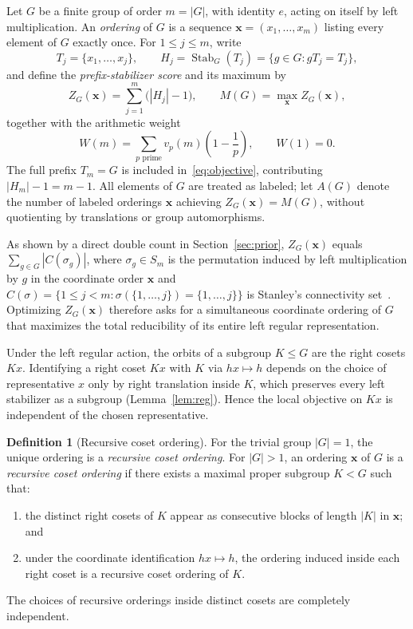 \documentclass[11pt,reqno]{amsart}
\numberwithin{equation}{section}
\theoremstyle{definition}
\newtheorem{definition}[theorem]{Definition}
\theoremstyle{remark}
\newcommand{\Stab}{\operatorname{Stab}}
\begin{document}
Let $G$ be a finite group of order $m = |G|$, with identity $e$, acting on itself by left multiplication. An \emph{ordering} of $G$ is a sequence $\mathbf{x}=(x_1,\ldots,x_m)$ listing every element of $G$ exactly once. For $1\le j\le m$, write
\begin{equation}
\label{eq:defs}
T_j = \{x_1,\ldots,x_j\},\qquad
H_j = \Stab_G(T_j) = \{g\in G : gT_j = T_j\},
\end{equation}
and define the \emph{prefix-stabilizer score} and its maximum by
\begin{equation}
\label{eq:objective}
Z_G(\mathbf{x}) = \sum_{j=1}^{m}\bigl(|H_j|-1\bigr),\qquad
M(G) = \max_{\mathbf{x}} Z_G(\mathbf{x}),
\end{equation}
together with the arithmetic weight
\begin{equation}
\label{eq:weight}
W(m) = \sum_{p\text{ prime}} v_p(m)\!\left(1-\frac{1}{p}\right),\qquad W(1)=0.
\end{equation}
The full prefix $T_m=G$ is included in~\eqref{eq:objective}, contributing $|H_m|-1 = m-1$. All elements of $G$ are treated as labeled; let $A(G)$ denote the number of labeled orderings $\mathbf{x}$ achieving $Z_G(\mathbf{x})=M(G)$, without quotienting by translations or group automorphisms.

As shown by a direct double count in Section~\ref{sec:prior}, $Z_G(\mathbf{x})$ equals $\sum_{g\in G}|C(\sigma_g)|$, where $\sigma_g\in S_m$ is the permutation induced by left multiplication by $g$ in the coordinate order $\mathbf{x}$ and $C(\sigma)=\{1\le j<m : \sigma(\{1,\ldots,j\})=\{1,\ldots,j\}\}$ is Stanley's connectivity set~\cite{Sta05}. Optimizing $Z_G(\mathbf{x})$ therefore asks for a simultaneous coordinate ordering of $G$ that maximizes the total reducibility of its entire left regular representation.

Under the left regular action, the orbits of a subgroup $K\le G$ are the right cosets $Kx$. Identifying a right coset $Kx$ with $K$ via $hx\mapsto h$ depends on the choice of representative $x$ only by right translation inside $K$, which preserves every left stabilizer as a subgroup (Lemma~\ref{lem:reg}). Hence the local objective on $Kx$ is independent of the chosen representative.

\begin{definition}[Recursive coset ordering]
\label{def:recursive}
For the trivial group $|G|=1$, the unique ordering is a \emph{recursive coset ordering}. For $|G|>1$, an ordering $\mathbf{x}$ of $G$ is a \emph{recursive coset ordering} if there exists a maximal proper subgroup $K<G$ such that:
\begin{enumerate}[label=(\roman*),leftmargin=2em]
\item the distinct right cosets of $K$ appear as consecutive blocks of length $|K|$ in $\mathbf{x}$; and
\item under the coordinate identification $hx\mapsto h$, the ordering induced inside each right coset is a recursive coset ordering of $K$.
\end{enumerate}
The choices of recursive orderings inside distinct cosets are completely independent.
\end{definition}
\end{document}
